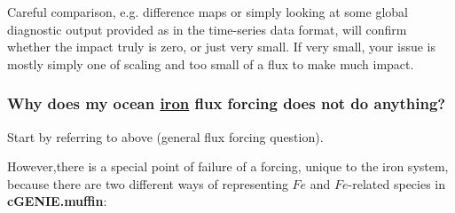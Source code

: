 \documentclass[11pt,fleqn]{book} %
\begin{document}
Careful comparison, e.g. difference maps or simply looking at some global diagnostic output provided as in the time-series data format, will confirm whether the impact truly is zero, or just very small. If very small, your issue is mostly simply one of scaling and too small of a flux to make much impact.

%
\subsubsection{Why does my ocean \uline{iron} flux forcing does not do anything?}

Start by referring to above (general flux forcing question).

\noindent However,there is a special point of failure of a forcing, unique to the iron system, because there are two different ways of representing \(Fe\) and \(Fe\)-related species in \textbf{cGENIE.muffin}:
\end{document}
